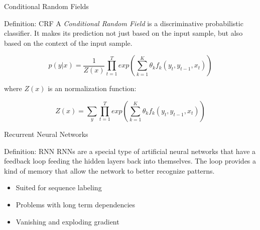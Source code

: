 \documentclass[12pt, tikz]{beamer}
\begin{document}
\begin{frame}[fragile]{Conditional Random Fields}
	\begin{block}{Definition: CRF}
	A \textit{Conditional Random Field} is a discriminative probabilistic classifier. It makes its prediction not just based on the input sample, but also based on the context of the input sample.
	\end{block}
	\pause
	\vspace{-0.35cm}
	\begin{equation}
	p(y|x) = \frac{1}{Z(x)} \prod_{t=1}^T exp(\sum_{k=1}^{K} \theta_k f_k(y_t, y_{t-1}, x_t))
	\end{equation}

	where $Z(x)$ is an normalization function:

	\begin{equation}
	Z(x) = \sum_{y} \prod_{t=1}^{T} exp(\sum_{k=1}^{K} \theta_k f_k(y_t, y_{t-1}, x_t))
	\end{equation}
\end{frame}

\begin{frame}[fragile]{Recurrent Neural Networks}
	
	\begin{block}{Definition: RNN}
		RNNs are a special type of artificial neural networks that have a feedback loop feeding the hidden layers back into themselves. The loop provides a kind of memory that allow the network to better recognize patterns.
	\end{block}
	\pause
	\begin{itemize}
		\item Suited for sequence labeling
		\item Problems with long term dependencies
		\item Vanishing and exploding gradient
	\end{itemize}
\end{frame}
\end{document}
